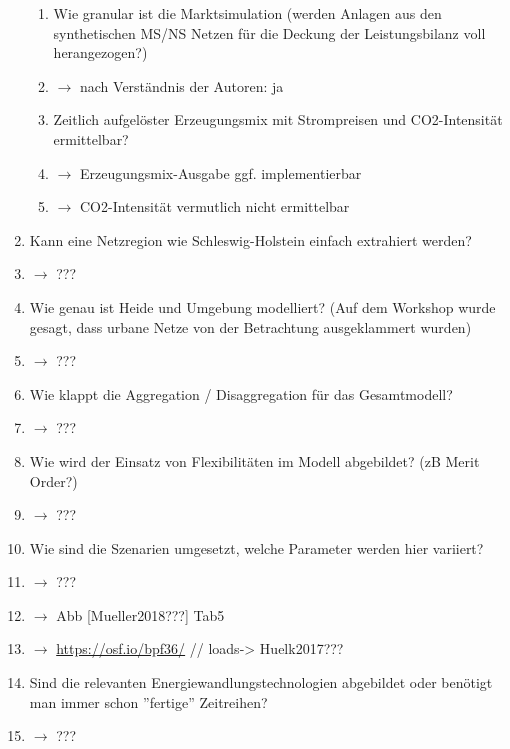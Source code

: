 \documentclass[
a4paper,     %
12pt         %
]{scrartcl}  %
\begin{document}
\begin{enumerate}
\begin{enumerate}
		\item Wie granular ist die Marktsimulation (werden Anlagen aus den synthetischen MS/NS Netzen für die Deckung der Leistungsbilanz voll herangezogen?)
		\item[]$\rightarrow$ nach Verständnis der Autoren: ja
		\item Zeitlich aufgelöster Erzeugungsmix mit Strompreisen und CO2-Intensität ermittelbar?
		\item[] $\rightarrow$ Erzeugungsmix-Ausgabe ggf. implementierbar
		\item[] $\rightarrow$ CO2-Intensität vermutlich nicht ermittelbar
	\end{enumerate}

	\item  Kann eine Netzregion wie Schleswig-Holstein einfach extrahiert werden?
	\item[] $\rightarrow$ ???
	\item Wie genau ist Heide und Umgebung modelliert? (Auf dem Workshop wurde gesagt, dass urbane Netze von der Betrachtung ausgeklammert wurden)
	\item[] $\rightarrow$ ???

	\item Wie klappt die Aggregation / Disaggregation für das Gesamtmodell?
	\item[] $\rightarrow$ ???
	\item Wie wird der Einsatz von Flexibilitäten im Modell abgebildet? (zB Merit Order?)
	\item[] $\rightarrow$ ???
	\item Wie sind die Szenarien umgesetzt, welche Parameter werden hier variiert?
	\item[] $\rightarrow$ ???
	\item[] $\rightarrow$ Abb [Mueller2018???] Tab5
	\item[] $\rightarrow$ \url{https://osf.io/bpf36/} // loads-> Huelk2017???
	\item Sind die relevanten Energiewandlungstechnologien abgebildet oder benötigt man immer schon ''fertige'' Zeitreihen?
	\item[] $\rightarrow$ ???
\end{enumerate}

\end{document}
